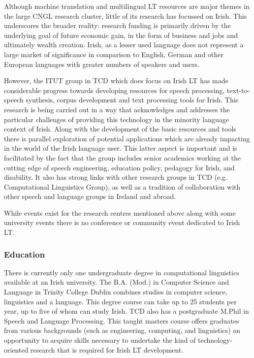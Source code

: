\begin{multicols}{2}
Although machine translation and multilingual LT resources are major themes in the large CNGL research cluster, little of its research has focussed on Irish. This underscores the broader reality: research funding is primarily driven by the underlying goal of future economic gain, in the form of business and jobs and ultimately wealth creation. Irish, as a lesser used language does not represent a large market of significance in comparison to English, German and other European languages with greater numbers of speakers and users.

However, the ITUT group in TCD which does focus on Irish LT has made considerable progress towards developing resources for speech processing, text-to-speech synthesis, corpus development and text processing tools for Irish. This research is being carried out in a way that acknowledges and addresses the particular challenges of providing this technology in the minority language context of Irish. Along with the development of the basic resources and tools there is parallel exploration of potential applications which are already impacting in the world of the Irish language user. This latter aspect is important and is facilitated by the fact that the group includes senior academics working at the cutting edge of speech engineering, education policy, pedagogy for Irish, and disability.  It also has strong links with other research groups in TCD (e.g. Computational Linguistics Group), as well as a tradition of collaboration with other speech and language groups in Ireland and abroad.

While events exist for the research centres mentioned above along with some university events there is no conference or community event dedicated to Irish LT.


\subsubsection{Education}
There is currently only one undergraduate degree in computational linguistics available at an Irish university. The B.A. (Mod.) in Computer Science  and Language in Trinity College Dublin combines studies in computer science, linguistics and a language. This degree course can take up to  25 students per year, up to five of whom can study Irish. TCD also has a postgraduate M.Phil in Speech and Language Processing. This taught masters course offers graduates from various backgrounds (such as engineering, computing, and linguistics) an opportunity to acquire skills necessary to undertake the kind of technology-oriented research that is required for Irish LT development.  


\end{multicols}
